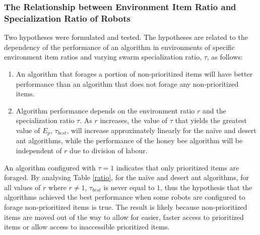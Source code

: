 \subsubsection{The Relationship between Environment Item Ratio and Specialization Ratio of Robots}
\label{relationship}
Two hypotheses were formulated and tested. The hypotheses are related to the dependency of the performance of an algorithm in environments of specific environment item ratios and varying swarm specialization ratio, $\tau$, as follows:

\begin{enumerate}
\item An algorithm that forages a portion of non-prioritized items will have better performance than an algorithm that does not forage any non-prioritized items.
\item Algorithm performance depends on the environment ratio $r$ and the specialization ratio $\tau$. As $r$ increases, the value of $\tau$ that yields the greatest value of $E_p$, $\tau_{best}$, will increase approximately linearly for the na\"ive and desert ant algorithms, while the performance of the honey bee algorithm will be independent of $r$ due to division of labour.
\end{enumerate}

An algorithm configured with $\tau=1$ indicates that only prioritized items are foraged. By analysing Table \ref{ratio}, for the na\"ive and desert ant algorithms, for all values of $r$ where $r \neq 1$, $\tau_{best}$ is never equal to $1$, thus the hypothesis that the algorithms achieved the best performance when some robots are configured to forage non-prioritized items is true. The result is likely because non-prioritized items are moved out of the way to allow for easier, faster access to prioritized items or allow access to inaccessible prioritized items.


